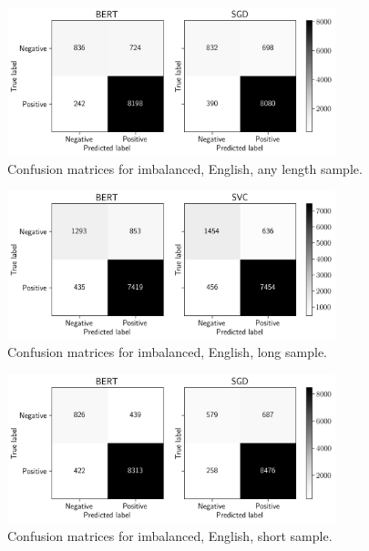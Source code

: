 \begin{figure}[!htb]
    \centering
    \includegraphics[width=0.85\textwidth]{figures/06_results/01_rfp/01_pol/01_cm/eng_any_any.png}
    \caption{Confusion matrices for imbalanced, English, any length sample.}
    \label{fig:A1_CM_IEA}
\end{figure}

\begin{figure}[!htb]
    \centering
    \includegraphics[width=0.85\textwidth]{figures/06_results/01_rfp/01_pol/01_cm/eng_any_long.png}
    \caption{Confusion matrices for imbalanced, English, long sample.}
    \label{fig:A1_CM_IEL}
\end{figure}

\begin{figure}[!htb]
    \centering
    \includegraphics[width=0.85\textwidth]{figures/06_results/01_rfp/01_pol/01_cm/eng_any_short.png}
    \caption{Confusion matrices for imbalanced, English, short sample.}
    \label{fig:A1_CM_IES}
\end{figure}

